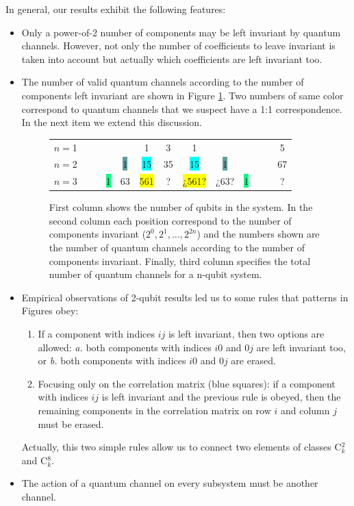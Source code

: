 \documentclass[11pt,dvipsnames]{article} %
\begin{document}
In general, our results exhibit the following features:
\begin{itemize}
\item Only a power-of-2 number of components may be left invariant by quantum
channels. However, not only the number of coefficients to leave invariant is
taken into account but actually which coefficients are left invariant too.

\item 
The number of valid quantum channels according to the number of components
left invariant are shown in Figure \ref{fig:CCs-by-components}. Two numbers
of same color correspond to quantum channels that we suspect have a 1:1 
correspondence. In the next item we extend this discussion.

\begin{figure}[H]
	\centering
	\begin{tabular}{>{$n=$}l<{\hfill}*{12}{c}}
1 &&&&&\colorbox{Apricot}{1}&3&\colorbox{Apricot}{1}&&&&&5\\
2 &&&&\colorbox{CadetBlue}{1}&\colorbox{Cyan}{15}&35&\colorbox{Cyan}{15}&\colorbox{CadetBlue}{1}&&&&67\\
3 &&&\colorbox{SpringGreen}{1}&\colorbox{RedOrange}{63}&\colorbox{Yellow}{561}&?&\colorbox{Yellow}{¿561?}&
\colorbox{RedOrange}{¿63?}&\colorbox{SpringGreen}{1}&&&?
\end{tabular}
\caption{First column shows the number of qubits in the system.  In the second
column each position correspond to the number of components invariant ($2^0,
2^1, \ldots, 2^{2n}$) and the numbers shown are the number of quantum channels
according to the number of components invariant.  Finally, third column
specifies the total number of quantum channels for a n-qubit system.}
\label{fig:CCs-by-components}
\end{figure}

\item Empirical observations of 2-qubit results led us to some rules that
patterns in Figures obey:
	\begin{enumerate}
	\item If a component with indices $ij$ is left invariant, then two
	options are allowed: \textit{a.} both components with indices $i0$ and
	$0j$ are left invariant too, or \textit{b.} both components with
        indices $i0$ and $0j$ are erased.
	\item Focusing only on the correlation matrix (blue squares): if a
component with indices $ij$ is left invariant and the previous rule is
obeyed, then the remaining components in the correlation matrix on row $i$ and
column $j$ must be erased.
	\end{enumerate}	
Actually, this two simple rules allow us to connect two elements of classes
C${}^2_k$ and C${}^8_k$.

\item The action of a quantum channel on every subsystem must be another
channel.
\end{itemize}
\end{document}
